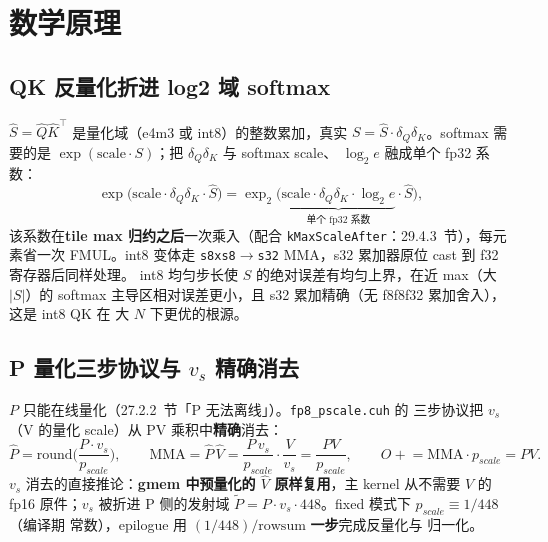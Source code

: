 \section{数学原理}

\subsection{QK 反量化折进 log2 域 softmax}\label{sec:29-qk-fold}

$\hat S=\hat Q\hat K^{\top}$ 是量化域（e4m3 或 int8）的整数累加，真实
$S=\hat S\cdot\delta_Q\delta_K$。softmax 需要的是
$\exp(\mathrm{scale}\cdot S)$；把 $\delta_Q\delta_K$ 与 softmax scale、
$\log_2 e$ 融成单个 fp32 系数：
\begin{equation}
  \exp\big(\mathrm{scale}\cdot\delta_Q\delta_K\cdot\hat S\big)
  =\exp_2\!\big(\underbrace{\mathrm{scale}\cdot\delta_Q\delta_K\cdot\log_2 e}_{\text{单个
  fp32 系数}}\cdot\hat S\big),
  \label{eq:29-sdequant}
\end{equation}
该系数在\textbf{tile max 归约之后}一次乘入（配合
\texttt{kMaxScaleAfter}：29.4.3~节），每元素省一次 FMUL。int8 变体走
\texttt{s8xs8$\to$s32} MMA，s32 累加器原位 cast 到 f32 寄存器后同样处理。
int8 均匀步长使 $S$ 的绝对误差有均匀上界，在近 max（大 $|S|$）的 softmax
主导区相对误差更小，且 s32 累加精确（无 f8f8f32 累加舍入），这是 int8 QK 在
大 $N$ 下更优的根源。

\subsection{P 量化三步协议与 $v_s$ 精确消去}\label{sec:29-pscale}

$P$ 只能在线量化（27.2.2~节「P 无法离线」）。\texttt{fp8\_pscale.cuh} 的
三步协议把 $v_s$（V 的量化 scale）从 PV 乘积中\textbf{精确}消去：
\begin{equation}
  \hat P=\mathrm{round}\!\Big(\frac{P\cdot v_s}{p_{scale}}\Big),\qquad
  \mathrm{MMA}=\hat P\,\hat V=\frac{P\,v_s}{p_{scale}}\cdot\frac{V}{v_s}
  =\frac{PV}{p_{scale}},\qquad
  O\mathrel{+}=\mathrm{MMA}\cdot p_{scale} = PV .
  \label{eq:29-threestep}
\end{equation}
$v_s$ 消去的直接推论：\textbf{gmem 中预量化的 $\hat V$ 原样复用}，主 kernel
从不需要 $V$ 的 fp16 原件；$v_s$ 被折进 P 侧的发射域
$\tilde P = P\cdot v_s\cdot448$。fixed 模式下 $p_{scale}\equiv1/448$（编译期
常数），epilogue 用 $(1/448)/\mathrm{rowsum}$ \textbf{一步}完成反量化与
归一化。

